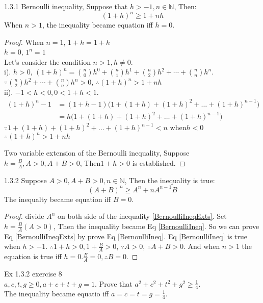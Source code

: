 	1.3.1 Bernoulli inequality, Suppose that $ h>-1, n\in\mathbb{N} $, Then:
	\begin{equation}\label{BernoulliIneq}
		(1+h)^n\ge1+nh
 	\end{equation}
 	When $ n>1 $, the inequality became equation iff $ h=0 $.\\
 	
\begin{proof}
 	When $ n=1 $, $ 1+h=1+h $\\
 	$ h=0 $, $ 1^n=1 $\\
 	Let's consider the condition $ n>1, h\ne 0 $.\\
 	i). $ h>0 $, $ (1+h)^n = \binom{n}{0}h^0+\binom{n}{1}h^1+\binom{n}{2}h^2+\cdots + \binom{n}{n}h^n$.\\
 	$ \because \binom{n}{2}h^2+\cdots + \binom{n}{n}h^n >0 $, $ \therefore (1+h)^n > 1+nh $\\
 	ii). $ -1<h<0, 0<1+h<1 $.
 	\begin{align*}
 		(1+h)^n-1 &=(1+h-1)\Big(1+(1+h)+(1+h)^2+\dots+(1+h)^{n-1}\Big)\\
 		&=h\Big(1+(1+h)+(1+h)^2+\dots+(1+h)^{n-1}\Big)
 	\end{align*}
 	$ \because 1+(1+h)+(1+h)^2+\dots+(1+h)^{n-1} < n $ when$ h<0 $\\
 	$ \therefore (1+h)^n > 1+nh $

 	Two variable extension of the Bernoulli inequality, Suppose
 	$ h = \frac{B}{A}, A>0, A+B>0 $, Then$ 1+h>0 $ is established.
\end{proof}	
 	
 	1.3.2 Suppose $ A>0, A+B>0, n\in\mathbb{N} $, Then the inequality is true:
 	\begin{equation}\label{BernoulliIneqExts}
 		(A+B)^n\ge A^n+nA^{n-1}B
 	\end{equation}
 	The inequalty became equation iff $ B=0 $.
 	
\begin{proof}	
 	divide $ A^n $ on both side of the inequality \ref{BernoulliIneqExts}. Set$ h=\frac{B}{A} (A>0) $, Then the inequality became Eq \ref{BernoulliIneq}.
 	So we can prove Eq \ref{BernoulliIneqExts} by prove Eq \ref{BernoulliIneq}.
 	Eq \ref{BernoulliIneq} is true when $ h>-1 $. $ \therefore 1+h>0, 1+\frac{B}{A}>0 $, $ \because A>0 $, $ \therefore A+B>0 $. And when $ n>1 $ the equation is true iff $h=0 $.$ \frac{B}{A}=0,\therefore B=0 $.
\end{proof}	 	
{Ex 1.3.2}
 	exercise 8\\
 	$ a,c,t,g \ge 0, a+c+t+g =1 $. Prove that $ a^2+c^2+t^2+g^2 \ge \frac{1}{4} $.\\ The inequality became equatio iff $ a=c=t=g=\frac{1}{4} $.\\
 	
